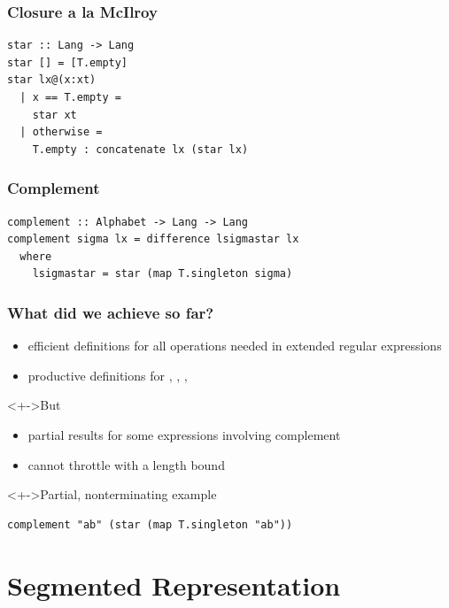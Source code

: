\documentclass[pdftex]{beamer}
\begin{document}
\begin{frame}
  \frametitle{Closure a la McIlroy }
\begin{lstlisting}[numbers=none]
star :: Lang -> Lang
star [] = [T.empty]
star lx@(x:xt)
  | x == T.empty =
    star xt
  | otherwise =
    T.empty : concatenate lx (star lx)
\end{lstlisting}
\end{frame}

\begin{frame}[fragile]
  \frametitle{Complement}
\begin{lstlisting}[numbers=none]
complement :: Alphabet -> Lang -> Lang
complement sigma lx = difference lsigmastar lx
  where
    lsigmastar = star (map T.singleton sigma)
\end{lstlisting}
\end{frame}

\begin{frame}[fragile]
  \frametitle{What did we achieve so far?}
  \begin{itemize}
  \item<+-> efficient definitions for all operations needed in extended regular expressions
  \item<+-> productive definitions for ,
    , , 
  \end{itemize}
  \begin{block}<+->{But}
    \begin{itemize}
    \item partial results for some expressions involving complement
    \item cannot throttle with a length bound
  \end{itemize}
  \end{block}
  \begin{exampleblock}<+->{Partial, nonterminating example}
\begin{lstlisting}[numbers=none]
complement "ab" (star (map T.singleton "ab"))
\end{lstlisting}
  \end{exampleblock}
\end{frame}

\section{Segmented Representation}
\end{document}

